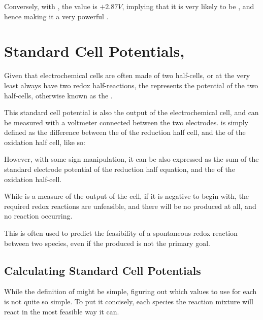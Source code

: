 			Conversely, with , the \Eo{} value is $+2.87V$, implying that it is very likely to be , and hence
			making it a very powerful .





	\pagebreak
	\section{Standard Cell Potentials, \MEcell{}}

		Given that electrochemical cells are often made of two half-cells, or at the very least always have two redox half-reactions,
		the \Ecell{} represents the  potential of the two half-cells, otherwise known as the .

		This standard cell potential is also the output  of the electrochemical cell, and can be measured with a voltmeter
		connected between the two electrodes. \Ecell{} is simply defined as the difference between the \Eo{} of the reduction half cell, and
		the \Eo{} of the oxidation half cell, like so:


		However, with some sign manipulation, it can be also expressed as the sum of the standard electrode potential of the reduction
		half equation, and the  of the oxidation half-cell.


		While \Ecell{} is a measure of the output  of the cell, if it is negative to begin with, the required redox
		reactions are unfeasible, and there will be no  produced at all, and no reaction occurring.

		This is often used to predict the feasibility of a spontaneous redox reaction between two species, even if the produced
		 is not the primary goal.


		\subsection{Calculating Standard Cell Potentials}

			While the definition of \Ecell{} might be simple, figuring out which values to use for each \Eo{} is not quite so simple. To put it
			concisely, each species the reaction mixture will react in the most feasible way it can.

